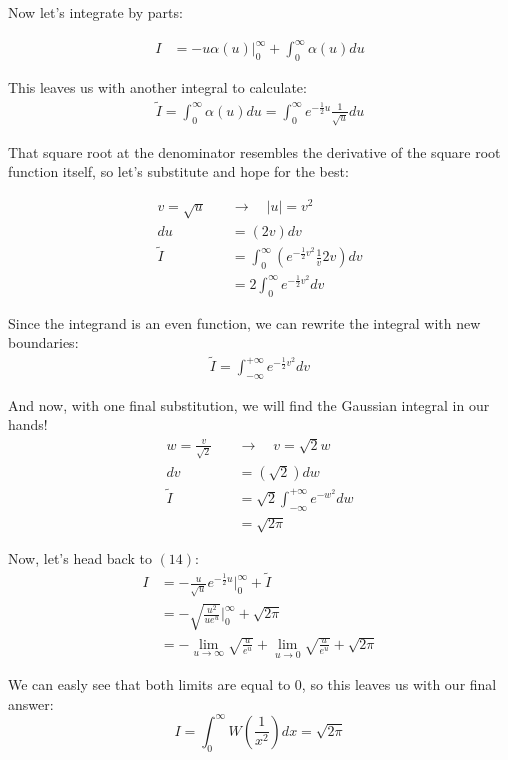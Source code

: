 \documentclass[12pt]{article}
\begin{document}
Now let's integrate by parts:

\begin{align}
    I &= -u\alpha(u)\Biggr|_{0}^{\infty} + \int_0^\infty \alpha(u)du
\end{align}

This leaves us with another integral to calculate:
\begin{align}
    \tilde{I} = \int_0^\infty \alpha(u)du = \int_0^\infty e^{-\frac{1}{2}u}\frac{1}{\sqrt{u}}du
\end{align}

That square root at the denominator resembles the derivative of the square root function itself, so let's substitute and hope for the best:

\begin{align}
    v = \sqrt{u} \hspace{1em} &\rightarrow \hspace{1em} |u| = v^2 \\
    du &= (2v)dv \\
    \tilde{I} &= \int_0^\infty \left(e^{-\frac{1}{2}v^2}\frac{1}{v}2v\right)dv \\
              &= 2\int_0^\infty e^{-\frac{1}{2}v^2} dv
\end{align}

Since the integrand is an even function, we can rewrite the integral with new boundaries:
\begin{align}
    \tilde{I} = \int_{-\infty}^{+\infty} e^{-\frac{1}{2}v^2} dv
\end{align}

And now, with one final substitution, we will find the Gaussian integral in our hands!
\begin{align}
    w = \frac{v}{\sqrt{2}} \hspace{1em} &\rightarrow \hspace{1em} v = \sqrt{2}w \\
    dv &= (\sqrt{2})dw \\
    \tilde{I} &= \sqrt{2}\int_{-\infty}^{+\infty} e^{-w^2} dw \\
              &= \sqrt{2\pi}
\end{align}

Now, let's head back to $(14)$:
\begin{align}
    I &= -\frac{u}{\sqrt{u}}e^{-\frac{1}{2}u}\Biggr|_{0}^{\infty} + \tilde{I} \\
      &= -\sqrt{\frac{u^2}{ue^u}}\Biggr|_{0}^{\infty} + \sqrt{2\pi} \\
      &= -\lim_{u\to\infty}\sqrt{\frac{u}{e^u}} + \lim_{u\to0}\sqrt{\frac{u}{e^u}} + \sqrt{2\pi}
\end{align}

We can easly see that both limits are equal to $0$, so this leaves us with our final answer:
$$ I = \int_0^\infty W\left(\frac{1}{x^2}\right)dx = \sqrt{2\pi} $$
\end{document}
